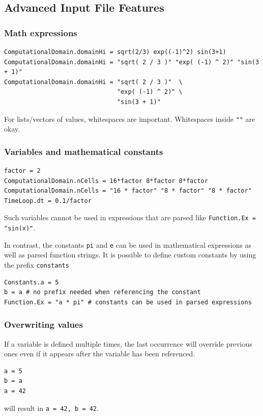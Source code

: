 \documentclass[11pt]{article}
\begin{document}
\subsection{Advanced Input File Features}
\subsubsection{Math expressions}
\begin{lstlisting}[language=pkgconfig]
ComputationalDomain.domainHi = sqrt(2/3) exp((-1)^2) sin(3+1)
ComputationalDomain.domainHi = "sqrt( 2 / 3 )" "exp( (-1) ^ 2)" "sin(3 + 1)"
ComputationalDomain.domainHi = "sqrt( 2 / 3 )"  \
							   "exp( (-1) ^ 2)" \
							   "sin(3 + 1)"
\end{lstlisting}
For lists/vectors of values, whitespaces are important. Whitespaces inside \verb|""| are okay.

\subsubsection{Variables and mathematical constants}
\begin{lstlisting}[language=pkgconfig]
factor = 2
ComputationalDomain.nCells = 16*factor 8*factor 8*factor
ComputationalDomain.nCells = "16 * factor" "8 * factor" "8 * factor"
TimeLoop.dt = 0.1/factor
\end{lstlisting}
Such variables cannot be used in expressions that are parsed like \verb|Function.Ex = "sin(x)"|.

In contrast, the constants \verb|pi| and \verb|e| can be used in mathematical expressions as well as parsed function strings. It is possible to define custom constants by using the prefix \verb|constants|
\begin{lstlisting}[language=pkgconfig]
Constants.a = 5
b = a # no prefix needed when referencing the constant
Function.Ex = "a * pi" # constants can be used in parsed expressions
\end{lstlisting}

\subsubsection{Overwriting values}
If a variable is defined multiple times, the last occurrence will override previous ones even if it appears after the variable has been referenced.
\begin{lstlisting}[language=pkgconfig]
a = 5
b = a
a = 42
\end{lstlisting}
will result in \verb|a = 42, b = 42|.
\end{document}
